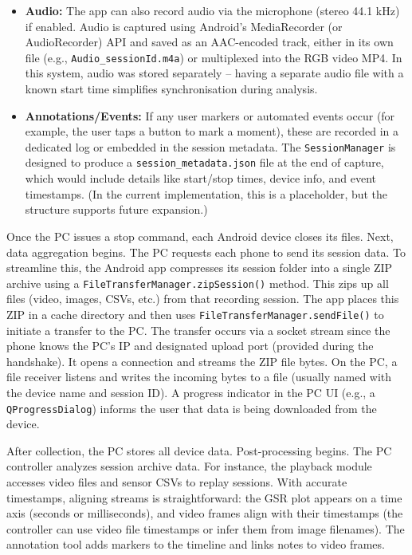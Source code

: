 \begin{itemize}
    \item \textbf{Audio:} The app can also record audio via the microphone (stereo 44.1 kHz) if enabled. Audio is captured using Android's MediaRecorder (or AudioRecorder) API and saved as an AAC-encoded track, either in its own file (e.g., \texttt{Audio\_\<sessionId\>.m4a}) or multiplexed into the RGB video MP4. In this system, audio was stored separately -- having a separate audio file with a known start time simplifies synchronisation during analysis.
    \item \textbf{Annotations/Events:} If any user markers or automated events occur (for example, the user taps a button to mark a moment), these are recorded in a dedicated log or embedded in the session metadata. The \texttt{SessionManager} is designed to produce a \texttt{session\_metadata.json} file at the end of capture, which would include details like start/stop times, device info, and event timestamps. (In the current implementation, this is a placeholder, but the structure supports future expansion.)
\end{itemize}

Once the PC issues a stop command, each Android device closes its files. Next, data aggregation begins. The PC requests each phone to send its session data. To streamline this, the Android app compresses its session folder into a single ZIP archive using a \texttt{FileTransferManager.zipSession()} method. This zips up all files (video, images, CSVs, etc.) from that recording session. The app places this ZIP in a cache directory and then uses \texttt{FileTransferManager.sendFile()} to initiate a transfer to the PC. The transfer occurs via a socket stream \textemdash since the phone knows the PC's IP and designated upload port (provided during the handshake). It opens a connection and streams the ZIP file bytes. On the PC, a file receiver listens and writes the incoming bytes to a file (usually named with the device name and session ID). A progress indicator in the PC UI (e.g., a \texttt{QProgressDialog}) informs the user that data is being downloaded from the device.

After collection, the PC stores all device data. Post-processing begins. The PC controller analyzes session archive data. For instance, the playback module accesses video files and sensor CSVs to replay sessions. With accurate timestamps, aligning streams is straightforward: the GSR plot appears on a time axis (seconds or milliseconds), and video frames align with their timestamps (the controller can use video file timestamps or infer them from image filenames). The annotation tool adds markers to the timeline and links notes to video frames.


